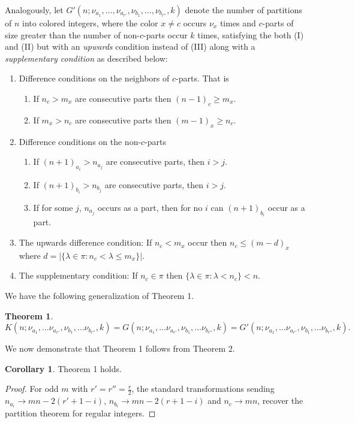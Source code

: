 \documentclass[12pt,a4paper]{amsart}
\newtheorem{theorem}{Theorem}
\theoremstyle{definition}
\theoremstyle{notation}
\theoremstyle{corollary}
\newtheorem{corollary}{Corollary}
\begin{document}
Analogously, let $G'(n;\nu_{a_1},\dots,\nu_{a_{r'}},\nu_{b_1},\dots,\nu_{b_{r''}},k)$ denote the number of partitions of $n$ into colored integers, where the color $x\not=c$ occurs $\nu_x$ times and $c$-parts of size greater than the number of non-$c$-parts occur $k$ times, satisfying the both (I) and (II) but with an \textit{upwards} condition instead of (III) along with a \textit{supplementary condition} as described below:
\begin{enumerate}[label=(\Roman*),ref=\Roman*]
    \item Difference conditions on the neighbors of $c$-parts. That is
    \begin{enumerate}[label=(\theenumi.\roman*),ref=\theenumi.\roman*]
        \item If $n_c>m_x$ are consecutive parts then $(n-1)_c\geq m_x$.
        \item If $m_x>n_c$ are consecutive parts then $(m-1)_x\geq n_c$.
    \end{enumerate}
    \item Difference conditions on the non-$c$-parts
    \begin{enumerate}[label=(\theenumi.\roman*),ref=\theenumi.\roman*]
        \item If $(n+1)_{a_i}>n_{a_j}$ are consecutive parts, then $i>j$.
        \item If $(n+1)_{b_i}>n_{b_j}$ are consecutive parts, then $i>j$.
        \item If for some $j$, $n_{a_j}$ occurs as a part, then for no $i$ can $(n+1)_{b_i}$ occur as a part.
    \end{enumerate}
    
    \item The upwards difference condition: If $n_c<m_x$ occur then $n_c\leq(m-d)_x$ where $d=|\{\lambda\in \pi :n_c<\lambda\leq m_x\}|$.

    \item The supplementary condition: If $n_c \in \pi$ then $\{\lambda\in\pi:\lambda<n_c\}<n$.
         
    
\end{enumerate}



We have the following generalization of Theorem 1.


\begin{theorem}
\[K(n;\nu_{a_1},\dots\nu_{a_{r'}},\nu_{b_1},\dots\nu_{b_{r''}},k)=G(n;\nu_{a_1},\dots\nu_{a_{r'}},\nu_{b_1},\dots\nu_{b_{r''}},k)=G'(n;\nu_{a_1},\dots\nu_{a_{r'}},\nu_{b_1},\dots\nu_{b_{r''}},k).\]
\end{theorem}
We now demonstrate that Theorem 1 follows from Theorem 2.
\begin{corollary}
    Theorem 1 holds.   
\end{corollary}
\begin{proof}
For odd $m$ with $r'=r''=\frac{r}{2}$, the standard transformations sending 
$n_{a_i}\to mn-2(r'+1-i)$, $n_{b_i}\to mn-2(r+1-i)$ and $n_c\to mn$, recover the partition theorem for regular integers.
\end{proof}
\end{document}

